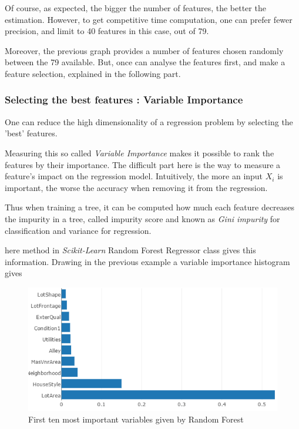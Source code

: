 \documentclass[english,11pt,openany]{report}
\theoremstyle{definition}
\theoremstyle{plain}
\theoremstyle{definition}
\begin{document}
\begin{appendices}
Of course, as expected, the bigger the number of features, the better the estimation. However, to get competitive time computation, one can prefer fewer precision, and limit to 40 features in this case, out of 79. 

Moreover, the previous graph provides a number of features chosen randomly between the 79 available. But, once can analyse the features first, and make a feature selection, explained in the following part.

\subsubsection{Selecting the best features : Variable Importance}

One can reduce the high dimensionality of a regression problem by selecting the 'best' features.

Measuring this so called \textit{Variable Importance} makes it possible to rank the features by their importance. The difficult part here is the way to measure a feature's impact on the regression model. 
Intuitively, the more an input $X_i$ is important, the worse the accuracy when removing it from the regression. 

Thus when training a tree, it can be computed how much each feature decreases the impurity in a tree, called impurity score and known as \textit{Gini impurity} for classification and variance for regression.

here method in \textit{Scikit-Learn} Random Forest Regressor class gives this information. 
Drawing in the previous example a variable importance histogram gives

\begin{figure}[H]
	\label{figure:vi}
	\includegraphics[scale=0.6]{RF_analysis/vi.png} 
	\caption{First ten most important variables given by Random Forest}
\end{figure}


\end{appendices}
\end{document}
